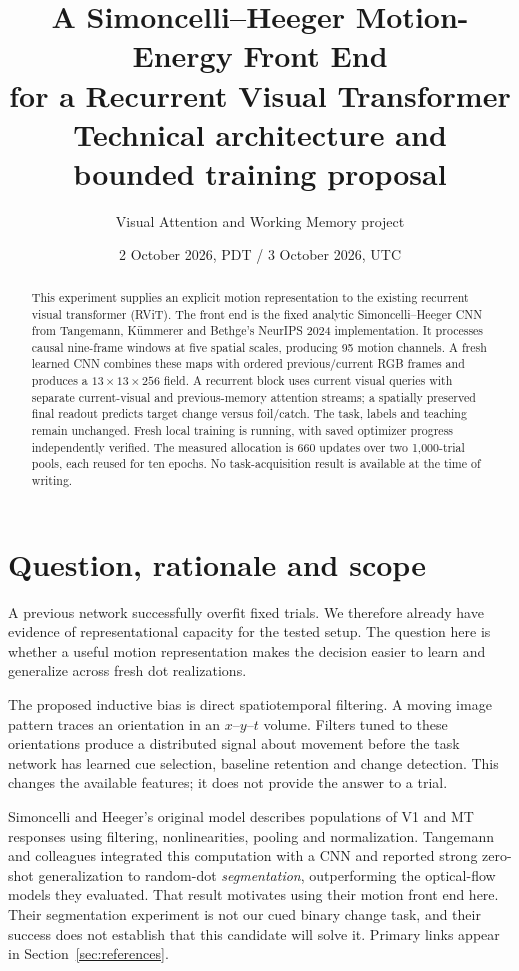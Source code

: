 \documentclass[11pt]{article}
\title{A Simoncelli--Heeger Motion-Energy Front End\\for a Recurrent Visual Transformer\\\large Technical architecture and bounded training proposal}
\author{Visual Attention and Working Memory project}
\date{2 October 2026, PDT / 3 October 2026, UTC}
\begin{document}
\maketitle

\begin{abstract}
This experiment supplies an explicit motion representation to the existing recurrent visual transformer (RViT). The front end is the fixed analytic Simoncelli--Heeger CNN from Tangemann, K\"ummerer and Bethge's NeurIPS 2024 implementation. It processes causal nine-frame windows at five spatial scales, producing 95 motion channels. A fresh learned CNN combines these maps with ordered previous/current RGB frames and produces a $13\times13\times256$ field. A recurrent block uses current visual queries with separate current-visual and previous-memory attention streams; a spatially preserved final readout predicts target change versus foil/catch. The task, labels and teaching remain unchanged. Fresh local training is running, with saved optimizer progress independently verified. The measured allocation is 660 updates over two 1,000-trial pools, each reused for ten epochs. No task-acquisition result is available at the time of writing.
\end{abstract}

\section{Question, rationale and scope}

A previous network successfully overfit fixed trials. We therefore already have evidence of representational capacity for the tested setup. The question here is whether a useful motion representation makes the decision easier to learn and generalize across fresh dot realizations.

The proposed inductive bias is direct spatiotemporal filtering. A moving image pattern traces an orientation in an $x$--$y$--$t$ volume. Filters tuned to these orientations produce a distributed signal about movement before the task network has learned cue selection, baseline retention and change detection. This changes the available features; it does not provide the answer to a trial.

Simoncelli and Heeger's original model describes populations of V1 and MT responses using filtering, nonlinearities, pooling and normalization. Tangemann and colleagues integrated this computation with a CNN and reported strong zero-shot generalization to random-dot \emph{segmentation}, outperforming the optical-flow models they evaluated. That result motivates using their motion front end here. Their segmentation experiment is not our cued binary change task, and their success does not establish that this candidate will solve it. Primary links appear in Section~\ref{sec:references}.
\end{document}
